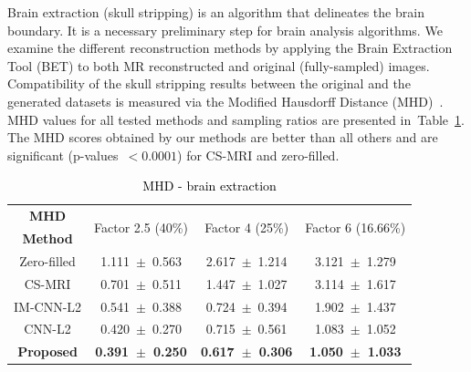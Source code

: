 \documentclass[10pt,journal,compsoc]{IEEEtran}
\begin{document}
Brain extraction (skull stripping) is an algorithm that delineates the brain boundary. It is a necessary preliminary step for brain analysis algorithms.
We examine the different reconstruction methods by applying the Brain Extraction Tool (BET) \cite{smith2002fast} to both MR reconstructed and original (fully-sampled) images. Compatibility of the skull stripping results between the original and the generated datasets is measured via the Modified Hausdorff Distance (MHD)~\cite{dubuisson1994modified}. 
%
%
%
MHD values for all tested methods and sampling ratios are presented in~Table~\ref{tbl:MHD}. The MHD scores obtained by our methods are better than all others and are significant (p-values~$<0.0001$) for CS-MRI and zero-filled.

\begin{table}[ht]
	\centering{}
	\begin{tabular}{|c||c||c||c|}
		\hline 
		\textbf{MHD} & \multicolumn{1}{c||}{\multirow{2}{*}{Factor 2.5 (40\%)}} & \multicolumn{1}{c||}{\multirow{2}{*}{Factor 4 (25\%)}} & \multicolumn{1}{c|}{\multirow{2}{*}{Factor 6 (16.66\%)}} \tabularnewline
		\textbf{Method} & \multicolumn{1}{c||}{} & \multicolumn{1}{c||}{} & \multicolumn{1}{c|}{} \tabularnewline \cline{1-4}
				
		Zero-filled         &1.111~$\pm$~0.563  &2.617~$\pm$~1.214   &3.121~$\pm$~1.279\tabularnewline
		CS-MRI              &0.701~$\pm$~0.511  &1.447~$\pm$~1.027   &3.114~$\pm$~1.617\tabularnewline
		IM-CNN-L2           &0.541~$\pm$~0.388  &0.724~$\pm$~0.394   &1.902~$\pm$~1.437\tabularnewline
		CNN-L2              &0.420~$\pm$~0.270  &0.715~$\pm$~0.561   &1.083~$\pm$~1.052\tabularnewline
		\textbf{Proposed}   &\textbf{0.391~$\pm$~0.250}  &\textbf{0.617~$\pm$~0.306}   &\textbf{1.050~$\pm$~1.033}\tabularnewline
		\hline 
	\end{tabular}\caption{\textcolor{black}{\footnotesize{}{}MHD - brain extraction}{\footnotesize{}\label{tbl:MHD}}}
\end{table}
\end{document}
